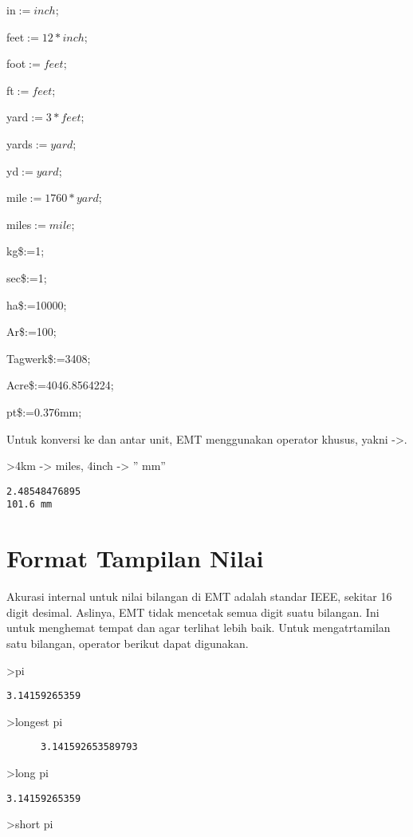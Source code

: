 \documentclass[
]{book}
\begin{document}
in\(:=inch\);

feet\(:=12*inch\);

foot\(:=feet\);

ft\(:=feet\);

yard\(:=3*feet\);

yards\(:=yard\);

yd\(:=yard\);

mile\(:=1760*yard\);

miles\(:=mile\);

kg\$:=1;

sec\$:=1;

ha\$:=10000;

Ar\$:=100;

Tagwerk\$:=3408;

Acre\$:=4046.8564224;

pt\$:=0.376mm;

Untuk konversi ke dan antar unit, EMT menggunakan operator khusus, yakni -\textgreater.

\textgreater4km -\textgreater{} miles, 4inch -\textgreater{} '' mm''

\begin{verbatim}
2.48548476895
101.6 mm
\end{verbatim}

\chapter{Format Tampilan Nilai}\label{format-tampilan-nilai}

Akurasi internal untuk nilai bilangan di EMT adalah standar IEEE, sekitar 16 digit desimal. Aslinya, EMT tidak mencetak semua digit suatu bilangan. Ini untuk menghemat tempat dan agar terlihat lebih baik. Untuk mengatrtamilan satu bilangan, operator berikut dapat digunakan.

\textgreater pi

\begin{verbatim}
3.14159265359
\end{verbatim}

\textgreater longest pi

\begin{verbatim}
      3.141592653589793 
\end{verbatim}

\textgreater long pi

\begin{verbatim}
3.14159265359
\end{verbatim}

\textgreater short pi
\end{document}
